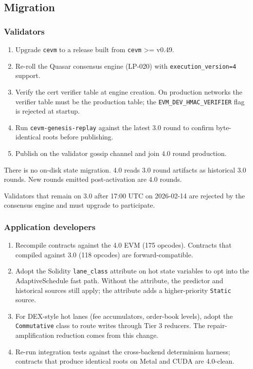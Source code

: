 \documentclass[
]{article}
\providecommand{\tightlist}{%
  \setlength{\itemsep}{0pt}\setlength{\parskip}{0pt}}
\begin{document}
\subsection{Migration}\label{migration}

\subsubsection{Validators}\label{validators}

\begin{enumerate}
\def\labelenumi{\arabic{enumi}.}
\tightlist
\item
  Upgrade \texttt{cevm} to a release built from \texttt{cevm}
  \textgreater= v0.49.
\item
  Re-roll the Quasar consensus engine (LP-020) with
  \texttt{execution\_version=4} support.
\item
  Verify the cert verifier table at engine creation. On production
  networks the verifier table must be the production table; the
  \texttt{EVM\_DEV\_HMAC\_VERIFIER} flag is rejected at startup.
\item
  Run \texttt{cevm-genesis-replay} against the latest 3.0 round to
  confirm byte-identical roots before publishing.
\item
  Publish on the validator gossip channel and join 4.0 round production.
\end{enumerate}

There is no on-disk state migration. 4.0 reads 3.0 round artifacts as
historical 3.0 rounds. New rounds emitted post-activation are 4.0
rounds.

Validators that remain on 3.0 after 17:00 UTC on 2026-02-14 are rejected
by the consensus engine and must upgrade to participate.

\subsubsection{Application developers}\label{application-developers}

\begin{enumerate}
\def\labelenumi{\arabic{enumi}.}
\tightlist
\item
  Recompile contracts against the 4.0 EVM (175 opcodes). Contracts that
  compiled against 3.0 (118 opcodes) are forward-compatible.
\item
  Adopt the Solidity \texttt{lane\_class} attribute on hot state
  variables to opt into the AdaptiveSchedule fast path. Without the
  attribute, the predictor and historical sources still apply; the
  attribute adds a higher-priority \texttt{Static} source.
\item
  For DEX-style hot lanes (fee accumulators, order-book levels), adopt
  the \texttt{Commutative} class to route writes through Tier 3
  reducers. The repair-amplification reduction comes from this change.
\item
  Re-run integration tests against the cross-backend determinism
  harness; contracts that produce identical roots on Metal and CUDA are
  4.0-clean.
\end{enumerate}
\end{document}
